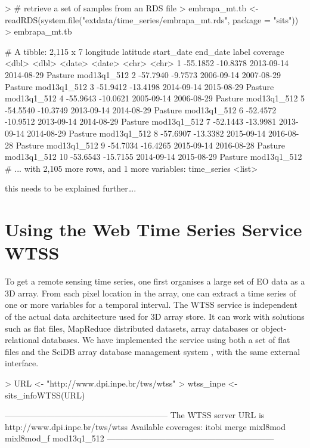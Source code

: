 \documentclass[article]{jss}
\begin{document}
\begin{CodeChunk}

\begin{CodeInput}
> # retrieve a set of samples from an RDS file
> embrapa_mt.tb <- readRDS(system.file("extdata/time_series/embrapa_mt.rds", package = "sits"))
> embrapa_mt.tb
\end{CodeInput}

\begin{CodeOutput}
# A tibble: 2,115 x 7
   longitude latitude start_date   end_date   label    coverage
       <dbl>    <dbl>     <date>     <date>   <chr>       <chr>
 1  -55.1852 -10.8378 2013-09-14 2014-08-29 Pasture mod13q1_512
 2  -57.7940  -9.7573 2006-09-14 2007-08-29 Pasture mod13q1_512
 3  -51.9412 -13.4198 2014-09-14 2015-08-29 Pasture mod13q1_512
 4  -55.9643 -10.0621 2005-09-14 2006-08-29 Pasture mod13q1_512
 5  -54.5540 -10.3749 2013-09-14 2014-08-29 Pasture mod13q1_512
 6  -52.4572 -10.9512 2013-09-14 2014-08-29 Pasture mod13q1_512
 7  -52.1443 -13.9981 2013-09-14 2014-08-29 Pasture mod13q1_512
 8  -57.6907 -13.3382 2015-09-14 2016-08-28 Pasture mod13q1_512
 9  -54.7034 -16.4265 2015-09-14 2016-08-28 Pasture mod13q1_512
10  -53.6543 -15.7155 2014-09-14 2015-08-29 Pasture mod13q1_512
# ... with 2,105 more rows, and 1 more variables: time_series <list>
\end{CodeOutput}
\end{CodeChunk}

this needs to be explained further\ldots{}.

\section{Using the Web Time Series Service
WTSS}\label{using-the-web-time-series-service-wtss}

To get a remote sensing time series, one first organises a large set of
EO data as a 3D array. From each pixel location in the array, one can
extract a time series of one or more variables for a temporal interval.
The WTSS service is independent of the actual data architecture used for
3D array store. It can work with solutions such as flat files, MapReduce
distributed datasets, array databases or object-relational databases. We
have implemented the service using both a set of flat files and the
SciDB array database management system \citep{Stonebraker2013}, with the
same external interface.

\begin{CodeChunk}

\begin{CodeInput}
> URL <- "http://www.dpi.inpe.br/tws/wtss"
> wtss_inpe <- sits_infoWTSS(URL)
\end{CodeInput}

\begin{CodeOutput}
-----------------------------------------------------------
The WTSS server URL is http://www.dpi.inpe.br/tws/wtss
Available coverages: 
itobi
merge
mixl8mod
mixl8mod_f
mod13q1_512
------------------------------------------------------------
\end{CodeOutput}
\end{CodeChunk}
\end{document}
